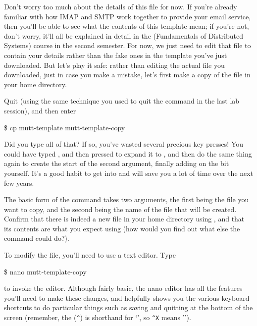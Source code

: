 Don't worry too much about the details of this file for now. If you're already familiar with how IMAP and SMTP work together to provide your email service, then you'll be able to see what the contents of this template mean; if you're not, don't worry, it'll all be explained in detail in the  (Fundamentals of Distributed Systems) course in the second semester. For now, we just need to edit that file to contain your details rather than the fake ones in the template you've just downloaded. But let's play it safe: rather than editing the actual file you downloaded, just in case you make a mistake, let's first make a copy of the file in your home directory.


Quit  (using the same technique you used to quit the  command in the last lab session), and then enter

\begin{ttoutenv}
\$ cp mutt-template mutt-template-copy
\end{ttoutenv}

Did you type all of that? If so, you've wasted several precious key presses! You could have typed , and then pressed  to expand it to , and then do the same thing again to create the start of the second argument, finally adding on the  bit yourself. It's a good habit to get into and will save you a lot of time over the next few years.

The basic form of the  command takes two arguments, the first being the file you want to copy, and the second being the name of the file that will be created. Confirm that there is indeed a new file in your home directory using , and that its contents are what you expect using  (how would you find out what else the  command could do?).

To modify the file, you'll need to use a text editor. Type
\begin{ttoutenv}
\$ nano mutt-template-copy
\end{ttoutenv}

to invoke the  editor. Although fairly basic, the nano editor has all the features you'll need to make these changes, and helpfully shows you the various keyboard shortcuts to do particular things such as saving and quitting at the bottom of the screen (remember, the  (\texttt{\textasciicircum}) is shorthand for `', so \texttt{\textasciicircum X} means '').

